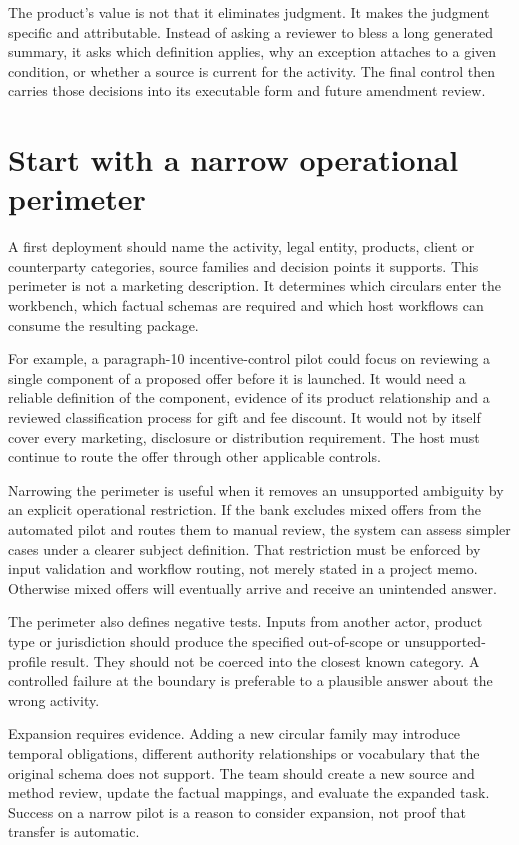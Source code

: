 \documentclass[12pt,a4paper,oneside,openany]{book}
\begin{document}
The product's value is not that it eliminates judgment. It makes the judgment
specific and attributable. Instead of asking a reviewer to bless a long generated
summary, it asks which definition applies, why an exception attaches to a given
condition, or whether a source is current for the activity. The final control
then carries those decisions into its executable form and future amendment review.

\section{Start with a narrow operational perimeter}
\label{merge:M10:01}


A first deployment should name the activity, legal entity, products, client or
counterparty categories, source families and decision points it supports. This
perimeter is not a marketing description. It determines which circulars enter the
workbench, which factual schemas are required and which host workflows can consume
the resulting package.

For example, a paragraph-10 incentive-control pilot could focus on reviewing a
single component of a proposed offer before it is launched. It would need a
reliable definition of the component, evidence of its product relationship and a
reviewed classification process for gift and fee discount. It would not by itself
cover every marketing, disclosure or distribution requirement. The host must
continue to route the offer through other applicable controls.

Narrowing the perimeter is useful when it removes an unsupported ambiguity by an
explicit operational restriction. If the bank excludes mixed offers from the
automated pilot and routes them to manual review, the system can assess simpler
cases under a clearer subject definition. That restriction must be enforced by
input validation and workflow routing, not merely stated in a project memo.
Otherwise mixed offers will eventually arrive and receive an unintended answer.

The perimeter also defines negative tests. Inputs from another actor, product type
or jurisdiction should produce the specified out-of-scope or unsupported-profile
result. They should not be coerced into the closest known category. A controlled
failure at the boundary is preferable to a plausible answer about the wrong
activity.

Expansion requires evidence. Adding a new circular family may introduce temporal
obligations, different authority relationships or vocabulary that the original
schema does not support. The team should create a new source and method review,
update the factual mappings, and evaluate the expanded task. Success on a narrow
pilot is a reason to consider expansion, not proof that transfer is automatic.
\end{document}
